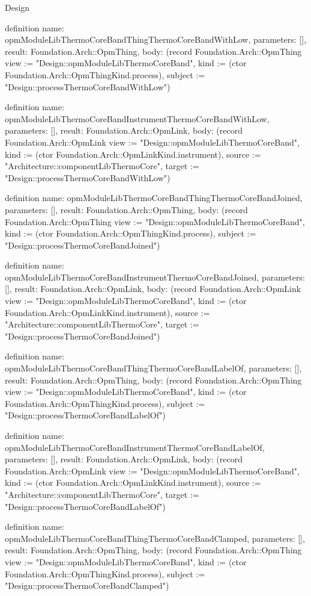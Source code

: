 \begin{lexlean}{Design}
\begin{semanticmodule}
definition{
  name: opmModuleLibThermoCoreBandThingThermoCoreBandWithLow,
  parameters: [],
  result: Foundation.Arch::OpmThing,
  body: (record Foundation.Arch::OpmThing {view := "Design::opmModuleLibThermoCoreBand", kind := (ctor Foundation.Arch::OpmThingKind.process), subject := "Design::processThermoCoreBandWithLow"})
}

definition{
  name: opmModuleLibThermoCoreBandInstrumentThermoCoreBandWithLow,
  parameters: [],
  result: Foundation.Arch::OpmLink,
  body: (record Foundation.Arch::OpmLink {view := "Design::opmModuleLibThermoCoreBand", kind := (ctor Foundation.Arch::OpmLinkKind.instrument), source := "Architecture::componentLibThermoCore", target := "Design::processThermoCoreBandWithLow"})
}

definition{
  name: opmModuleLibThermoCoreBandThingThermoCoreBandJoined,
  parameters: [],
  result: Foundation.Arch::OpmThing,
  body: (record Foundation.Arch::OpmThing {view := "Design::opmModuleLibThermoCoreBand", kind := (ctor Foundation.Arch::OpmThingKind.process), subject := "Design::processThermoCoreBandJoined"})
}

definition{
  name: opmModuleLibThermoCoreBandInstrumentThermoCoreBandJoined,
  parameters: [],
  result: Foundation.Arch::OpmLink,
  body: (record Foundation.Arch::OpmLink {view := "Design::opmModuleLibThermoCoreBand", kind := (ctor Foundation.Arch::OpmLinkKind.instrument), source := "Architecture::componentLibThermoCore", target := "Design::processThermoCoreBandJoined"})
}

definition{
  name: opmModuleLibThermoCoreBandThingThermoCoreBandLabelOf,
  parameters: [],
  result: Foundation.Arch::OpmThing,
  body: (record Foundation.Arch::OpmThing {view := "Design::opmModuleLibThermoCoreBand", kind := (ctor Foundation.Arch::OpmThingKind.process), subject := "Design::processThermoCoreBandLabelOf"})
}

definition{
  name: opmModuleLibThermoCoreBandInstrumentThermoCoreBandLabelOf,
  parameters: [],
  result: Foundation.Arch::OpmLink,
  body: (record Foundation.Arch::OpmLink {view := "Design::opmModuleLibThermoCoreBand", kind := (ctor Foundation.Arch::OpmLinkKind.instrument), source := "Architecture::componentLibThermoCore", target := "Design::processThermoCoreBandLabelOf"})
}

definition{
  name: opmModuleLibThermoCoreBandThingThermoCoreBandClamped,
  parameters: [],
  result: Foundation.Arch::OpmThing,
  body: (record Foundation.Arch::OpmThing {view := "Design::opmModuleLibThermoCoreBand", kind := (ctor Foundation.Arch::OpmThingKind.process), subject := "Design::processThermoCoreBandClamped"})
}


\end{semanticmodule}
\end{lexlean}

